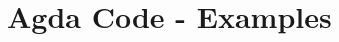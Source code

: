 \begin{code}
\AgdaSpace{}%
\AgdaSpace{}%
\AgdaSymbol{(}\AgdaSpace{}%
\AgdaSpace{}%
\AgdaSpace{}%
\AgdaSymbol{))}\<%
\\
%
\\[\AgdaEmptyExtraSkip]%
\>[0]\AgdaSpace{}%
\AgdaSpace{}%
\AgdaSpace{}%
\AgdaSpace{}%
\AgdaSpace{}%
\AgdaSymbol{=}\AgdaSpace{}%
\<%
\\
\>[0]\AgdaSpace{}%
\AgdaSpace{}%
\AgdaOperator{\AgdaInductiveConstructor{,}}\AgdaSpace{}%
\AgdaSpace{}%
\AgdaSpace{}%
\AgdaSpace{}%
\AgdaSpace{}%
\AgdaSymbol{=}\AgdaSpace{}%
\AgdaSpace{}%
\AgdaSpace{}%
\AgdaSpace{}%
\AgdaSpace{}%
\AgdaSymbol{(}\AgdaSpace{}%
\AgdaSymbol{(}\AgdaSpace{}%
\AgdaSpace{}%
\AgdaSpace{}%
\AgdaSymbol{))}\<%
\\
\>[0]\<%
\end{code}

\section{Agda Code - Examples}

